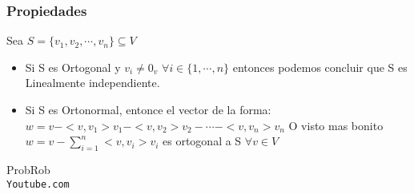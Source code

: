 \documentclass[12pt]{article}							    %
\begin{document}
\subsubsection{Propiedades}
Sea $S = \{ v_1 , v_2 , \cdots, v_n \} \subseteq V$

\begin{itemize}
    \item Si S es Ortogonal y $v_i \neq 0_v$ $\forall i \in \{1, \cdots, n\}$ entonces podemos concluir que S es Linealmente independiente.

    \item Si S es Ortonormal, entonce el vector de la forma:
    $ w = v - <v, v_1> v_1 - <v, v_2> v_2 - \cdots - <v, v_n> v_n $
    O visto mas bonito $w = v - \sum_{i = 1}^{n} <v, v_i>v_i$
    es ortogonal a S $\forall v \in V$
\end{itemize}



\clearpage

	\begin{thebibliography}{9}

		ProbRob
		\\\texttt{Youtube.com}


	 

\end{thebibliography}
\end{document}
